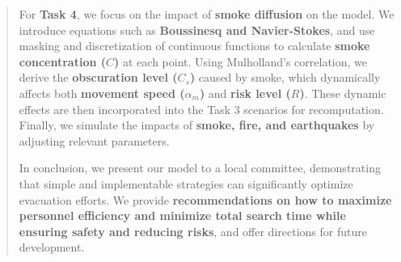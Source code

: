 \documentclass[12pt]{article}  %
\numberwithin{figure}{section}
\begin{document}
\begin{abstract}
For \textbf{Task 4}, we focus on the impact of \textbf{smoke diffusion} on the model. We introduce equations such as \textbf{Boussinesq and Navier-Stokes}, and use masking and discretization of continuous functions to calculate \textbf{smoke concentration ($C$)} at each point. Using Mulholland’s correlation, we derive the \textbf{obscuration level ($C_s$)} caused by smoke, which dynamically affects both \textbf{movement speed ($\alpha_m$)} and \textbf{risk level ($R$)}. These dynamic effects are then incorporated into the Task 3 scenarios for recomputation. Finally, we simulate the impacts of \textbf{smoke, fire, and earthquakes} by adjusting relevant parameters.


In conclusion, we present our model to a local committee, demonstrating that simple and implementable strategies can significantly optimize evacuation efforts. We provide \textbf{recommendations on how to maximize personnel efficiency and minimize total search time while ensuring safety and reducing risks}, and offer directions for future development.	
		
    
	
		\end{abstract}	
		\maketitle  %
		\tableofcontents  %
	
\end{document}
